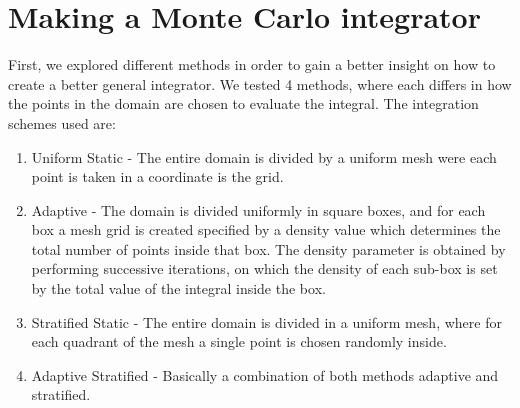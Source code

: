 \section{Making a Monte Carlo integrator}

First, we explored different methods
in order to gain a better insight on how to create a better general integrator. We tested 4 methods, where each differs in how
the points in the domain are chosen to evaluate the integral.
The integration schemes \cite{MCmethods} used are:
\begin{enumerate}
  \item Uniform Static - The entire domain is divided by a uniform mesh were each point is taken in a coordinate is the grid.
  \item Adaptive - The domain is divided uniformly in square boxes, and for each box a mesh grid is created
  specified by a density value which determines the total number of points inside that box. The density parameter
  is obtained by performing successive iterations, on which the density of each sub-box is set by the total value of the integral inside
  the box.
  \item Stratified Static - The entire domain is divided in a uniform mesh, where for each quadrant of the mesh
  a single point is chosen randomly inside.
  \item Adaptive Stratified - Basically a combination of both methods adaptive and stratified.
\end{enumerate}


